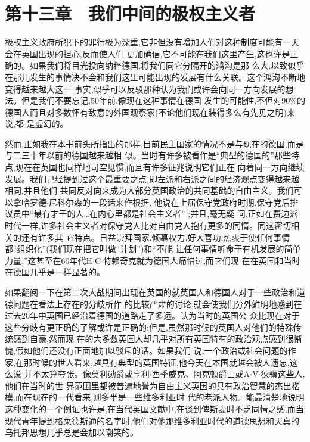 ﻿\documentclass[12pt]{article}
\begin{document}
\section{第十三章　我们中间的极权主义者}


极权主义政府所犯下的罪行极为深重,它非但没有增加人们对这种制度可能有一天会在英国出现的担心,反而使人们
更加确信,它不可能在我们这里产生,这也许是正确的。如果我们将目光投向纳粹德国,将我们同它分隔开的鸿沟是那
么大,以致似乎在那儿发生的事情决不会和我们这里可能出现的发展有什么关联。这个鸿沟不断地变得越来越大这一
事实,似乎可以反驳那种认为我们或许会向同一方向发展的想法。但是我们不要忘记,50年前,像现在这种事情在德国
发生的可能性,不但对90\%的德国人而且对多数怀有敌意的外国观察家(不论他们现在装得多么有先见之明)来说,都
是虚幻的。

然而,正如我在本书前头所指出的那样,目前民主国家的情况不是与现在的德国,而是与二三十年以前的德国越来越相
似。当时有许多被看作是``典型的德国的''那些特点,现在在英国也同样地司空见惯,而且有许多征兆说明它们正在
向着同一方向继续发展。我们己经提到过这个最重要之点,即左派和右派之间的经济观点变得越来越相同,并且他们
共同反对向来成为大部分英国政治的共同基础的自由主义。我们可以拿哈罗德$\cdot$尼科尔森的一段话来作根据,
他说在上届保守党政府时期,保守党后排议员中``最有才干的人\ldots 在内心里都是社会主义者'' ;并且,毫无疑
问,正如在费边派时代一样,许多社会主义者对保守党人比对自由党人抱有更多的同情。同这密切相关的还有许多其
它特点。日益崇拜国家,倾慕权力,好大喜功,热衷于使任何事情都``组织化''(我们现在把它叫做``计划'')和``不能
让任何事情听命于有机发展的简单力量,''这甚至在60年代H$\cdot$C$\cdot$特赖奇克就为德国人痛惜过,而它们现
在在英国和当时在德国几乎是一样显著的。

如果翻阅一下在第二次大战期间出现在英国的就英国人和德国人对于一些政治和道德问题在看法上存在的分歧所作
的比较严肃的讨论,就会使我们分外鲜明地感到在过去20年中英国已经沿着德国的道路走了多远。认为当时的英国公
众比现在对于这些分歧有更正确的了解或许是正确的;但是,虽然那时候的英国人对他们的特殊传统感到自豪,然而现
在的大多数英国人却几乎对所有英国特有的政治观点感到很惭愧,假如他们还没有正面地加以驳斥的话。如果我们
说,一个政治或社会问题的作家,在那时候的世人看来,越具有典型的英国特征,他今天在本国就越会被人遗忘,这么说
并不太算夸张。像莫利勋爵或亨利$\cdot$西季威克、阿克顿爵士或A$\cdot$V$\cdot$狄骥这些人,他们在当时的世
界范围里都被普遍地誉为自由主义英国的具有政治智慧的杰出楷模,而在现在的一代看来,则多半是一些维多利亚时
代的老派人物。能最清楚地说明这种变化的一个例证也许是,在当代英国文献中,在谈到俾斯麦时不乏同情之感,而当
现代青年提到格莱德斯通的名字时,他们对他那维多利亚时代的道德思想和天真的乌托邦思想几乎总是会加以嘲笑的。
\end{document}
